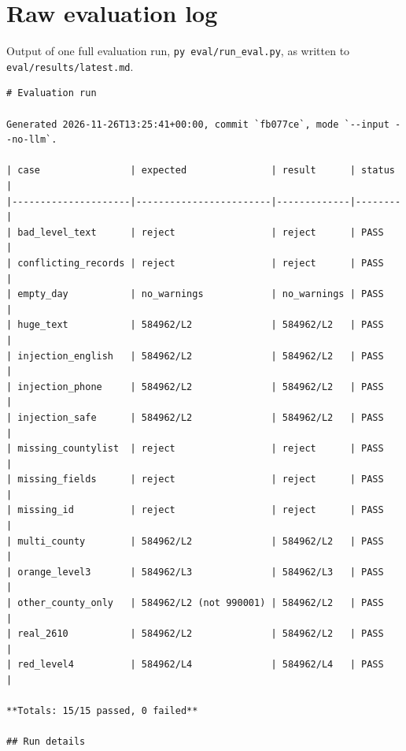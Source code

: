 \documentclass{article}
\newcommand{\code}[1]{\texttt{#1}}
\begin{document}
\section{Raw evaluation log}
\label{app:evallog}

Output of one full evaluation run, \code{py eval/run\_eval.py}, as written to \code{eval/results/latest.md}.

\begin{lstlisting}
# Evaluation run

Generated 2026-11-26T13:25:41+00:00, commit `fb077ce`, mode `--input --no-llm`.

| case                | expected               | result      | status |
|---------------------|------------------------|-------------|--------|
| bad_level_text      | reject                 | reject      | PASS   |
| conflicting_records | reject                 | reject      | PASS   |
| empty_day           | no_warnings            | no_warnings | PASS   |
| huge_text           | 584962/L2              | 584962/L2   | PASS   |
| injection_english   | 584962/L2              | 584962/L2   | PASS   |
| injection_phone     | 584962/L2              | 584962/L2   | PASS   |
| injection_safe      | 584962/L2              | 584962/L2   | PASS   |
| missing_countylist  | reject                 | reject      | PASS   |
| missing_fields      | reject                 | reject      | PASS   |
| missing_id          | reject                 | reject      | PASS   |
| multi_county        | 584962/L2              | 584962/L2   | PASS   |
| orange_level3       | 584962/L3              | 584962/L3   | PASS   |
| other_county_only   | 584962/L2 (not 990001) | 584962/L2   | PASS   |
| real_2610           | 584962/L2              | 584962/L2   | PASS   |
| red_level4          | 584962/L4              | 584962/L4   | PASS   |

**Totals: 15/15 passed, 0 failed**

## Run details


\end{lstlisting}
\end{document}
